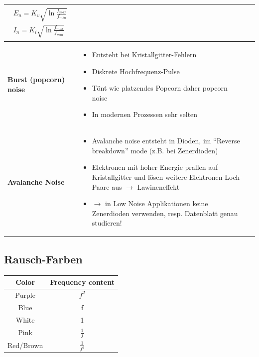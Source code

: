 \begin{longtable}{|>{\bfseries}p{3.5cm}|p{6cm}|p{8cm}|}
{\begin{gather*}
		E_{n}=K_{v}\sqrt{\ln{\frac{f_{max}}{f_{min}}}}\\
		I_{n}=K_{i}\sqrt{\ln{\frac{f_{max}}{f_{min}}}}
  	  \end{gather*}}
  	\\ \hline
  	Burst (popcorn) noise
  	& \begin{itemize}
  		\item Entsteht bei Kristallgitter-Fehlern
  		\item Diskrete Hochfrequenz-Pulse
  		\item Tönt wie platzendes Popcorn daher popcorn noise
  		\item In modernen Prozessen sehr selten
	  \end{itemize}
	&
	\\ \hline
	Avalanche Noise
	& \begin{itemize}
  		\item Avalanche noise entsteht in Dioden, im “Reverse breakdown” mode (z.B.
  		bei Zenerdioden)
  		\item Elektronen mit hoher Energie prallen auf Kristallgitter und lösen
  		weitere Elektronen-Loch-Paare aus $\to$ Lawineneffekt
  		\item $\to$ in Low Noise Applikationen keine Zenerdioden verwenden, resp.
  		Datenblatt genau studieren!
  	  \end{itemize}
  	&
  	\\ \hline
\end{longtable}

\subsection{Rausch-Farben}
\begin{tabular}{|c|c|}
\hline
\textbf{Color}&\textbf{Frequency content}\\\hline
Purple&$f^2$\\\hline
Blue&f\\\hline
White&1\\\hline
Pink&$\frac{1}{f}$\\\hline
Red/Brown&$\frac{1}{f^2}$\\\hline
\end{tabular}

